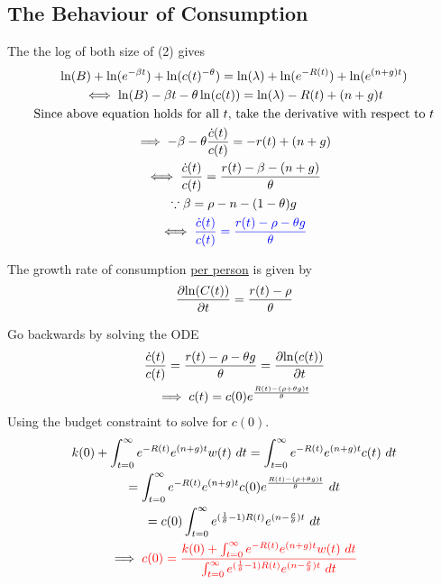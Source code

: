 \documentclass[11pt]{article}
\begin{document}
		\subsection{The Behaviour of Consumption}
			\par The the log of both size of (2) gives 
			\begin{gather}
				\ln(B) + \ln(e^{-\beta t}) + \ln(c(t)^{-\theta}) = \ln(\lambda) + \ln(e^{-R(t)}) + \ln(e^{(n+g)t}) \\
				\iff \ln(B) - \beta t - \theta \ln(c(t)) = \ln(\lambda) - R(t) + (n+g)t \\
				\text{{Since above equation holds for all $t$, take the derivative with respect to $t$}} \\
				\implies -\beta - \theta \frac{\dot{c}(t)}{c(t)} = -r(t) + (n+g) \\
				\iff \frac{\dot{c}(t)}{c(t)} = \frac{r(t) - \beta - (n + g)}{\theta} \\
				\because \beta = \rho - n - (1-\theta) g\\
				\iff 
				\textcolor{blue}{
					\frac{\dot{c}(t)}{c(t)} = \frac{r(t) - \rho - \theta g}{\theta}
				}
			\end{gather}
			\begin{remark}
				The growth rate of consumption \ul{per person} is given by
				\begin{equation}
					\frac{\partial{\ln(C(t))}}{\partial{t}} = \frac{r(t)-\rho}{\theta}
				\end{equation}
			\end{remark}
			\begin{remark}
				Go backwards by solving the ODE
				\begin{gather}
					\frac{\dot{c}(t)}{c(t)} = \frac{r(t) - \rho - \theta g}{\theta} = \frac{\partial{\ln(c(t))}}{\partial{t}} \\
					\implies c(t) = c(0) e^{\frac{R(t) - (\rho + \theta g)t}{\theta}}
				\end{gather}
				Using the budget constraint to solve for $c(0)$.
				\begin{gather}
					k(0) + \int_{t=0}^\infty {e^{-R(t)} e^{(n+g)t} w(t)\ dt} = \int_{t=0}^\infty {e^{-R(t)} e^{(n+g)t} c(t)\ dt} \\
					= \int_{t=0}^\infty {e^{-R(t)} e^{(n+g)t} c(0) e^{\frac{R(t) - (\rho + \theta g)t}{\theta}}}\ dt \\
					= c(0) \int_{t=0}^\infty e^{(\frac{1}{\theta} - 1)R(t)} e^{(n - \frac{\rho}{\theta})t} \ dt \\
					\implies
					\textcolor{red}{
					c(0) = \frac{
					k(0) + \int_{t=0}^\infty {e^{-R(t)} e^{(n+g)t} w(t)\ dt}
					}{
					\int_{t=0}^\infty e^{(\frac{1}{\theta} - 1)R(t)} e^{(n - \frac{\rho}{\theta})t} \ dt
					}
					}
				\end{gather}
			\end{remark}
\end{document}
